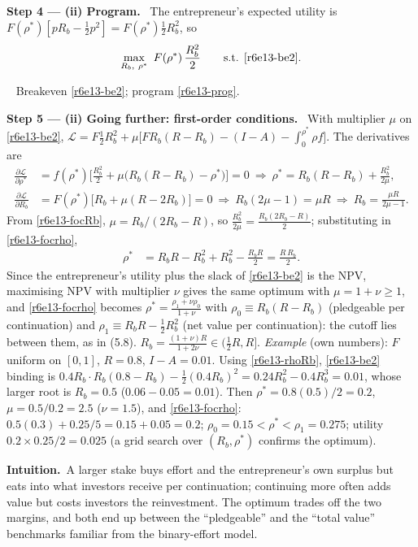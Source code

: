 \documentclass[11pt,a4paper]{article}
\newcommand{\step}[2]{\par\medskip\noindent\textbf{Step #1 --- #2.}~}
\newcommand{\intuition}{\par\medskip\noindent\textbf{Intuition.}~}
\newcommand{\answer}[1]{\par\smallskip\noindent\fbox{\textbf{Answer #1.}}~}
\begin{document}
\step{4}{(ii) Program} The entrepreneur's expected utility is $F(\rho^*)[pR_b-\tfrac12p^2]=F(\rho^*)\tfrac12R_b^2$, so
\begin{align}
  \max_{R_b,\ \rho^*}\ F(\rho^*)\,\frac{R_b^2}{2}\qquad\text{s.t. \eqref{r6e13-be2}.} \label{r6e13-prog}
\end{align}
\answer{(ii)} Breakeven \eqref{r6e13-be2}; program \eqref{r6e13-prog}.

\step{5}{(ii) Going further: first-order conditions} With multiplier $\mu$ on \eqref{r6e13-be2}, $\mathcal L=F\tfrac12R_b^2+\mu\big[FR_b(R-R_b)-(I-A)-\int_0^{\rho^*}\rho f\big]$. The derivatives are
\begin{align}
  \frac{\partial\mathcal L}{\partial\rho^*} &= f(\rho^*)\Big[\frac{R_b^2}{2}+\mu\big(R_b(R-R_b)-\rho^*\big)\Big]=0
  \ \Longrightarrow\ \rho^*=R_b(R-R_b)+\frac{R_b^2}{2\mu}, \label{r6e13-focrho}\\
  \frac{\partial\mathcal L}{\partial R_b} &= F(\rho^*)\big[R_b+\mu(R-2R_b)\big]=0
  \ \Longrightarrow\ R_b(2\mu-1)=\mu R\ \Longrightarrow\ R_b=\frac{\mu R}{2\mu-1}. \label{r6e13-focRb}
\end{align}
From \eqref{r6e13-focRb}, $\mu=R_b/(2R_b-R)$, so $\frac{R_b^2}{2\mu}=\frac{R_b(2R_b-R)}{2}$; substituting in \eqref{r6e13-focrho},
\begin{align}
  \rho^* &= R_bR-R_b^2+R_b^2-\frac{R_bR}{2} = \frac{R\,R_b}{2}. \label{r6e13-rhoRb}
\end{align}
Since the entrepreneur's utility plus the slack of \eqref{r6e13-be2} is the NPV, maximising NPV with multiplier $\nu$ gives the same optimum with $\mu=1+\nu\ge1$, and \eqref{r6e13-focrho} becomes $\rho^*=\frac{\rho_1+\nu\rho_0}{1+\nu}$ with $\rho_0\equiv R_b(R-R_b)$ (pledgeable per continuation) and $\rho_1\equiv R_bR-\tfrac12R_b^2$ (net value per continuation): the cutoff lies between them, as in (5.8). $R_b=\frac{(1+\nu)R}{1+2\nu}\in(\tfrac12R,R]$.
\emph{Example} (own numbers): $F$ uniform on $[0,1]$, $R=0.8$, $I-A=0.01$. Using \eqref{r6e13-rhoRb}, \eqref{r6e13-be2} binding is $0.4R_b\cdot R_b(0.8-R_b)-\tfrac12(0.4R_b)^2=0.24R_b^2-0.4R_b^3=0.01$, whose larger root is $R_b=0.5$ ($0.06-0.05=0.01$). Then $\rho^*=0.8(0.5)/2=0.2$, $\mu=0.5/0.2=2.5$ ($\nu=1.5$), and \eqref{r6e13-focrho}: $0.5(0.3)+0.25/5=0.15+0.05=0.2$; $\rho_0=0.15<\rho^*<\rho_1=0.275$; utility $0.2\times0.25/2=0.025$ (a grid search over $(R_b,\rho^*)$ confirms the optimum).

\intuition A larger stake buys effort and the entrepreneur's own surplus but eats into what investors receive per continuation; continuing more often adds value but costs investors the reinvestment. The optimum trades off the two margins, and both end up between the ``pledgeable'' and the ``total value'' benchmarks familiar from the binary-effort model.
\end{document}
